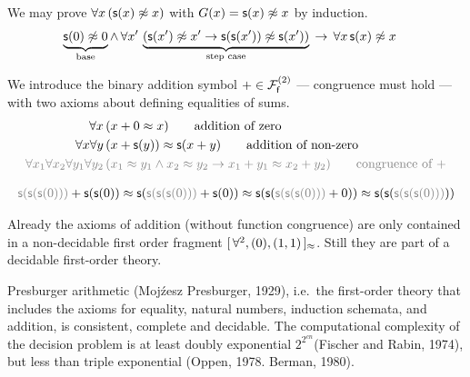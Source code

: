 \begin{example}
	We may prove \( \forall x\, (\msucc(x) \mNE x) \) with \( G(x) = \msucc(x) \mNE x \) by induction.
	\begin{align*}
		\underbrace{\msucc(0)\mNE 0}_{\text{base}}
		\land \, \forall x' \, &
		\underbrace{
			\left( \msucc(x')\mNE x' \limp \msucc(\msucc(x'))\mNE \msucc(x') \right)
		}_{\text{step case}}
		\, \limp \, \forall x \, \msucc(x)\mNE x
		\end{align*}
\end{example}

\begin{definition}
	[Addition]\label{def:addition:axioms}
	We introduce the binary addition symbol \( +\in\mcFfn[2] \)
	--- congruence must hold ---
	with two axioms about defining equalities of sums.
\begin{align*}
\forall x\,
&(x+0 \mEQ x)
\tag*{addition of zero}\\
\forall x\forall y\,
&(x+\msucc(y)) \mEQ \msucc(x+y)
\tag*{addition of non-zero}
\\
\colG\forall x_1\forall x_2\forall y_1\forall y_2\,
&\colG (x_1\mEQ y_1\land x_2\mEQ y_2 \limp x_1+y_1\mEQ x_2+y_2)
\tag*{congruence of \( + \)}
\end{align*}
\end{definition}

\begin{example}
	\begin{gather*}
	{\colG \msucc(\msucc(\msucc(0)))} + \msucc(\msucc(0))
	\mEQ\msucc({\colG \msucc(\msucc(\msucc(0)))} + \msucc(0))
	\mEQ \msucc(\msucc(
	{\colG \msucc(\msucc(\msucc(0)))} + 0))
	\mEQ \msucc(\msucc(
	{\colG \msucc(\msucc(\msucc(0)))}))
	\end{gather*}
\end{example}

\begin{remark}
	Already the axioms of addition (without function congruence)
	are only contained in a non-decidable first order fragment
	\( [ \, \forall^2 , (0), (1,1) \, ]{}_{\mEQ} \).
	Still they are part of a decidable first-order theory.
\end{remark}

\begin{theorem}Presburger arithmetic (Moj\'{z}esz Presburger, 1929), i.e.\ the first-order theory that includes the axioms for equality, natural numbers, induction schemata, and addition, is consistent, complete and decidable. The computational complexity of the decision problem is at least doubly exponential \( 2^{2^{cn}} \)(Fischer and Rabin, 1974), but less than triple exponential (Oppen, 1978. Berman, 1980).
\end{theorem}

